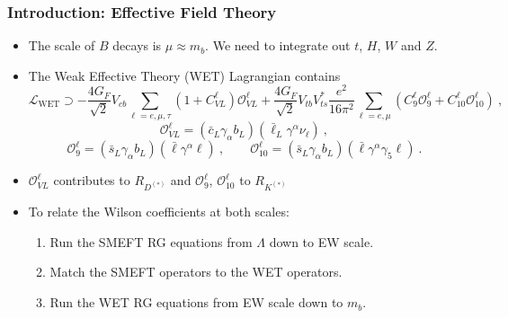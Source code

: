 \documentclass[mathserif, 10pt, dvipsnames]{beamer}
\begin{document}
\begin{frame}\frametitle{Introduction: Effective Field Theory}
\begin{itemize}

\item The scale of $B$ decays is $\mu \approx m_b$. We need to integrate out $t$, $H$, $W$ and $Z$.

\item The Weak Effective Theory (WET) Lagrangian contains
{\scriptsize $$\mathcal{L}_{\text{WET}} \supset -\frac{4 G_F}{\sqrt{2}}V_{cb}\sum_{\ell = e, \mu, \tau} (1 + C_{VL}^\ell) \mathcal{O}_{VL}^\ell + \frac{4G_F}{\sqrt{2}}V_{tb}V_{ts}^*\frac{e^2}{16\pi^2}\sum_{\ell=e,\mu} (C_9^\ell \mathcal{O}_9^\ell  + C_{10}^\ell \mathcal{O}_{10}^\ell) \ ,$$}
{ $$\mathcal{O}_{VL}^\ell = (\bar{c}_L \gamma_\alpha b_L)(\bar{\ell}_L \gamma^\alpha \nu_\ell)\ ,$$ $$\mathcal{O}_9^\ell = (\bar{s}_L \gamma_\alpha b_L)(\bar{\ell} \gamma^\alpha \ell)\ , \qquad \mathcal{O}_{10}^\ell = (\bar{s}_L \gamma_\alpha b_L)(\bar{\ell} \gamma^\alpha \gamma_5 \ell) \ .$$}

\item $\mathcal{O}_{VL}^\ell$ contributes to $R_{D^{(*)}}$ and $\mathcal{O}_9^\ell$, $\mathcal{O}_{10}^\ell$ to $R_{K^{(*)}}$

\item To relate the Wilson coefficients at both scales:
\begin{enumerate}
    \item Run the SMEFT RG equations from $\Lambda$ down to EW scale.
    \item Match the SMEFT operators to the WET operators.
    \item Run the WET RG equations from EW scale down to $m_b$.
\end{enumerate}

\end{itemize}
\end{frame}
\end{document}
